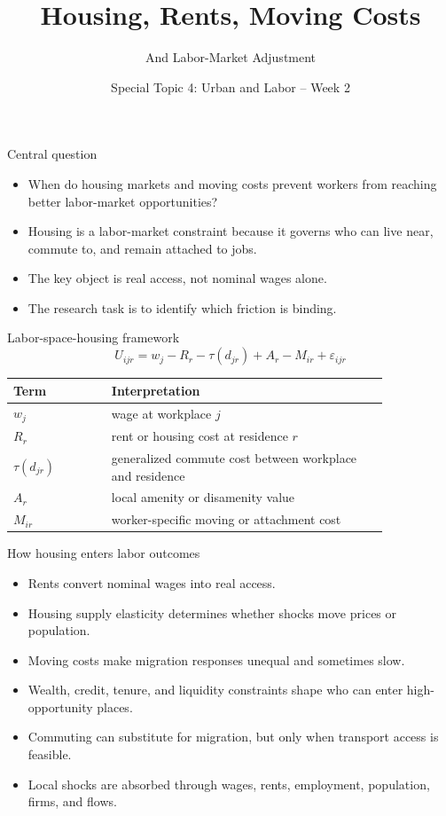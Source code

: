 \documentclass[aspectratio=169,11pt]{beamer}
\title{Housing, Rents, Moving Costs}
\subtitle{And Labor-Market Adjustment}
\author{Special Topic 4: Urban and Labor -- Week 2}
\date{}
\begin{document}
\begin{frame}
  \titlepage
\end{frame}

\begin{frame}{Central question}
\begin{itemize}
    \item When do housing markets and moving costs prevent workers from reaching better labor-market opportunities?
    \item Housing is a labor-market constraint because it governs who can live near, commute to, and remain attached to jobs.
    \item The key object is real access, not nominal wages alone.
    \item The research task is to identify which friction is binding.
\end{itemize}
\end{frame}

\begin{frame}{Labor-space-housing framework}
\[
U_{ijr} = w_j - R_r - \tau(d_{jr}) + A_r - M_{ir} + \varepsilon_{ijr}
\]
\small
\begin{tabular}{p{0.22\linewidth} p{0.62\linewidth}}
\toprule
Term & Interpretation \\
\midrule
$w_j$ & wage at workplace $j$ \\
$R_r$ & rent or housing cost at residence $r$ \\
$\tau(d_{jr})$ & generalized commute cost between workplace and residence \\
$A_r$ & local amenity or disamenity value \\
$M_{ir}$ & worker-specific moving or attachment cost \\
\bottomrule
\end{tabular}
\end{frame}

\begin{frame}{How housing enters labor outcomes}
\begin{itemize}
    \item Rents convert nominal wages into real access.
    \item Housing supply elasticity determines whether shocks move prices or population.
    \item Moving costs make migration responses unequal and sometimes slow.
    \item Wealth, credit, tenure, and liquidity constraints shape who can enter high-opportunity places.
    \item Commuting can substitute for migration, but only when transport access is feasible.
    \item Local shocks are absorbed through wages, rents, employment, population, firms, and flows.
\end{itemize}
\end{frame}
\end{document}
